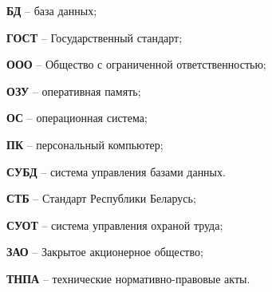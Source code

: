   \label{sec:reduction}


\par \textbf{БД} – база данных;
\par \textbf{ГОСТ} – Государственный стандарт;
\par \textbf{ООО} – Общество с ограниченной ответственностью;
\par \textbf{ОЗУ} – оперативная память;
\par \textbf{ОС} – операционная система;
\par \textbf{ПК} – персональный компьютер;
\par \textbf{СУБД} – система управления базами данных.
\par \textbf{СТБ} – Стандарт Республики Беларусь;
\par \textbf{СУОТ} – система управления охраной труда;
\par \textbf{ЗАО} – Закрытое акционерное общество;
\par \textbf{ТНПА} – технические нормативно-правовые акты.

